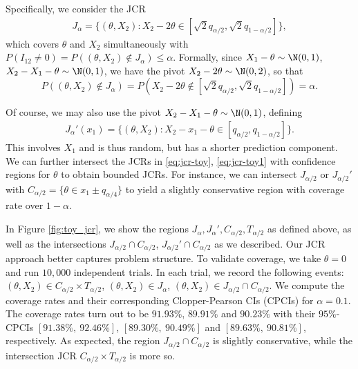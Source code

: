\documentclass[english]{article}
\begin{document}
Specifically, we consider the JCR
\begin{align}\label{eq:jcr-toy}
    J_\alpha = \{(\theta,X_2): X_2-2\theta \in [\sqrt{2}q_{\alpha/2},\sqrt{2}q_{1-\alpha/2}]\},
\end{align}
which covers $\theta$ and $X_2$ simultaneously with $P(I_{12}\neq0) = P((\theta,X_2) \notin J_\alpha) \leq \alpha$.
Formally, 
since $X_1 - \theta \sim \N(0,1)$, $X_2 - X_1 -\theta \sim \N(0,1)$, we have the pivot $X_2 - 2\theta \sim \N(0,2)$, so that
$$
P((\theta,X_2) \notin J_\alpha) = P(X_2-2\theta \notin [\sqrt{2}q_{\alpha/2},\sqrt{2}q_{1-\alpha/2}]) = \alpha.
$$

Of course, we may also use the pivot $X_2 - X_1 - \theta \sim \N(0,1)$, defining
\begin{align}\label{eq:jcr-toy1}
J_\alpha'(x_1) = \{(\theta,X_2): X_2-x_1 - \theta \in [q_{\alpha/2},q_{1-\alpha/2}]\}.
\end{align}
This involves $X_1$  and is thus random, but has a shorter prediction component. 
We can further intersect the JCRs in \eqref{eq:jcr-toy}, \eqref{eq:jcr-toy1} with confidence regions for $\theta$ 
to obtain bounded JCRs. 
For instance, we can intersect $J_{\alpha/2}$ or $J_{\alpha/2}'$ with $C_{\alpha/2}= \{\theta \in x_1 \pm q_{\alpha/4}\}$ to yield a slightly conservative region with coverage rate over $1-\alpha$. %

In Figure \ref{fig:toy_jcr}, we show the regions $J_{\alpha}, J_{\alpha}', C_{\alpha/2}, T_{\alpha/2}$ as defined above,
as well as the intersections $J_{\alpha/2} \cap C_{\alpha/2}$, $J_{\alpha/2}' \cap C_{\alpha/2}$ as we described. 
Our JCR approach better captures problem structure.
To validate coverage, 
we take $\theta = 0$ and run $10,000$ independent trials. 
In each trial, we record the following events: 
$(\theta, X_2) \in C_{\alpha/2} \times T_{\alpha/2}$, $(\theta,X_2) \in J_{\alpha}$, $(\theta,X_2) \in J_{\alpha/2} \cap C_{\alpha/2}$.
We compute the coverage rates and their corresponding Clopper-Pearson CIs (CPCIs) for $\alpha = 0.1$. 
The coverage rates turn out to be $91.93\%$, $89.91\%$ and $90.23\%$ with their $95\%$-CPCIs $[91.38\%,\ 92.46\%]$, $[89.30\%,\ 90.49\%]$ and $[89.63\%,\ 90.81\%]$, respectively. 
As expected, the region $J_{\alpha/2} \cap C_{\alpha/2}$ is slightly conservative, 
while 
the intersection JCR $ C_{\alpha/2} \times T_{\alpha/2}$ is more so. 
\end{document}
